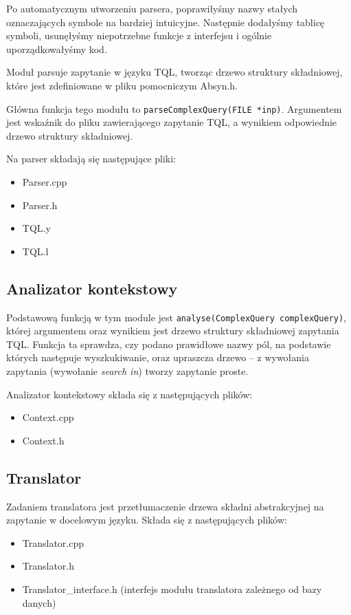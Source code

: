 Po automatycznym utworzeniu parsera, 
poprawiłyśmy nazwy stałych oznaczających symbole na bardziej intuicyjne.
Następnie
dodałyśmy tablicę symboli,
usunęłyśmy niepotrzebne funkcje z interfejsu
i ogólnie uporządkowałyśmy kod.

Moduł  parsuje zapytanie w języku TQL, tworząc drzewo struktury składniowej, które jest zdefiniowane w pliku pomocniczym Absyn.h.

Główna funkcja tego modułu to \verb|parseComplexQuery(FILE *inp)|. Argumentem jest wskaźnik do pliku zawierającego zapytanie TQL, 
a wynikiem odpowiednie drzewo struktury składniowej.

Na parser składają się następujące pliki:
\begin{itemize}
 \item Parser.cpp
 \item Parser.h
 \item TQL.y %
 \item TQL.l %
\end{itemize}


\subsection{Analizator kontekstowy}
Podstawową funkcją w tym module jest \verb|analyse(ComplexQuery complexQuery)|, której argumentem oraz wynikiem jest 
drzewo struktury składniowej zapytania TQL. Funkcja ta
 sprawdza, czy podano prawidłowe nazwy pól, na podstawie których następuje wyszkukiwanie,  %
oraz upraszcza drzewo -- z wywołania zapytania (wywołanie \textit{search in}) tworzy zapytanie proste.

Analizator kontekstowy składa się z następujących plików:
\begin{itemize}
 \item Context.cpp
 \item Context.h
\end{itemize}

\subsection{Translator}
Zadaniem translatora jest przetłumaczenie drzewa składni abstrakcyjnej na zapytanie w docelowym języku.
Składa się z następujących plików:
\begin {itemize}
 \item Translator.cpp
 \item Translator.h
 \item Translator\_interface.h (interfejs modułu translatora zależnego od bazy danych)
\end {itemize}

